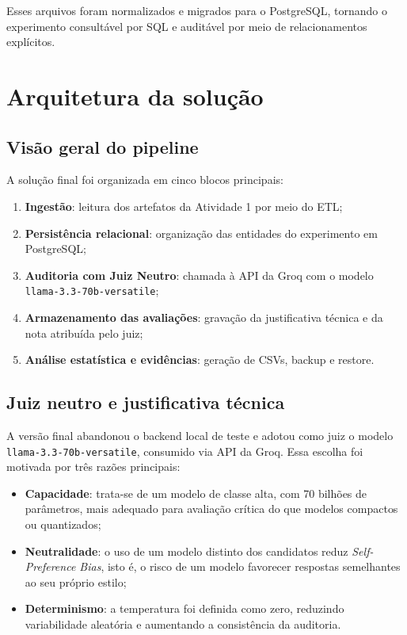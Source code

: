 \documentclass[12pt,a4paper]{article}
\begin{document}
Esses arquivos foram normalizados e migrados para o PostgreSQL, tornando o experimento consultável por SQL e auditável por meio de relacionamentos explícitos.

\section{Arquitetura da solução}

\subsection{Visão geral do pipeline}

A solução final foi organizada em cinco blocos principais:

\begin{enumerate}[leftmargin=1.2cm]
    \item \textbf{Ingestão}: leitura dos artefatos da Atividade 1 por meio do ETL;
    \item \textbf{Persistência relacional}: organização das entidades do experimento em PostgreSQL;
    \item \textbf{Auditoria com Juiz Neutro}: chamada à API da Groq com o modelo \texttt{llama-3.3-70b-versatile};
    \item \textbf{Armazenamento das avaliações}: gravação da justificativa técnica e da nota atribuída pelo juiz;
    \item \textbf{Análise estatística e evidências}: geração de CSVs, backup e restore.
\end{enumerate}

\subsection{Juiz neutro e justificativa técnica}

A versão final abandonou o backend local de teste e adotou como juiz o modelo \texttt{llama-3.3-70b-versatile}, consumido via API da Groq. Essa escolha foi motivada por três razões principais:

\begin{itemize}[leftmargin=1.2cm]
    \item \textbf{Capacidade}: trata-se de um modelo de classe alta, com 70 bilhões de parâmetros, mais adequado para avaliação crítica do que modelos compactos ou quantizados;
    \item \textbf{Neutralidade}: o uso de um modelo distinto dos candidatos reduz \textit{Self-Preference Bias}, isto é, o risco de um modelo favorecer respostas semelhantes ao seu próprio estilo;
    \item \textbf{Determinismo}: a temperatura foi definida como zero, reduzindo variabilidade aleatória e aumentando a consistência da auditoria.
\end{itemize}
\end{document}
